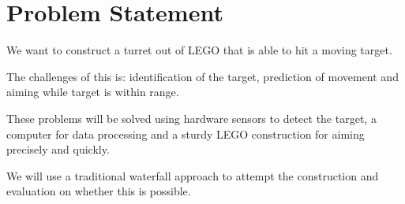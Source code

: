 \section{Problem Statement} 
We want to construct a turret out of LEGO that is able to hit a moving target.

The challenges of this is: identification of the target, prediction of movement and aiming while target is within range. 

These problems will be solved using hardware sensors to detect the target, a computer for data processing and a sturdy LEGO construction for aiming precisely and quickly.

We will use a traditional waterfall approach to attempt the construction and evaluation on whether this is possible.